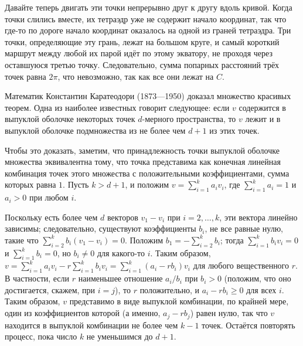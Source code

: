 Давайте теперь двигать эти точки непрерывно друг к другу вдоль кривой.
Когда точки слились вместе, их тетраэдр уже не содержит начало координат, так что где-то по дороге начало координат оказалось на одной из граней тетраэдра.
Три точки, определяющие эту грань, лежат на большом круге, и самый короткий маршрут между любой их парой идёт по этому экватору, не проходя через оставшуюся третью точку.
Следовательно, сумма попарных расстояний трёх точек равна $2\pi$, что невозможно, так как все они лежат на $C$.

Математик Константин Каратеодори (1873---1950) доказал множество красивых теорем.
Одна из наиболее известных говорит следующее: если $v$ содержится в выпуклой оболочке некоторых точек $d$-мерного  пространства, то $v$ лежит и в выпуклой оболочке подмножества из не более чем $d+1$ из этих точек.

Чтобы это доказать, заметим, что принадлежность точки выпуклой оболочке множества
эквивалентна тому, что точка представима как конечная линейная комбинация точек этого множества с положительными коэффициентами, сумма которых равна $1$.
Пусть $k>d+1$, и положим $v=\sum_{i=1}^k a_iv_i$, где $\sum_{i=1}^k a_i=1$ и $a_i>0$ при любом $i$.

Поскольку есть более чем $d$ векторов $v_1-v_i$ при $i=2,\dots,k$, эти вектора линейно зависимы;
следовательно, существуют коэффициенты $b_i$, не все равные нулю, такие что $\sum_{i=2}^k b_i(v_1-v_i)=0$.
Положим $b_1=-\sum_{i=2}^k b_i$; тогда $\sum_{i=1}^k b_i v_i=0$ и $\sum_{i=1}^k b_i=0$, но $b_i\ne 0$ для какого-то $i$.
Таким образом, $v=\sum_{i=1}^k a_iv_i-r\sum_{i=1}^k b_iv_i=\sum_{i=1}^k (a_i-rb_i)v_i$ для любого вещественного $r$.
В частности, если $r$ наименьшее отношение $a_i/b_i$  при $b_i>0$ (положим, что оно достигается, скажем, при $i=j$), то $r$ положительно, и $a_i-rb_i\ge0$ для всех $i$.
Таким образом, $v$ представимо в виде выпуклой комбинации, по крайней мере, один из коэффициентов которой (а именно, $a_j-rb_j$) равен нулю, так что $v$ находится в выпуклой комбинации не более чем $k-1$ точек.
Остаётся повторять процесс, пока число $k$ не уменьшимся до $d+1$.

